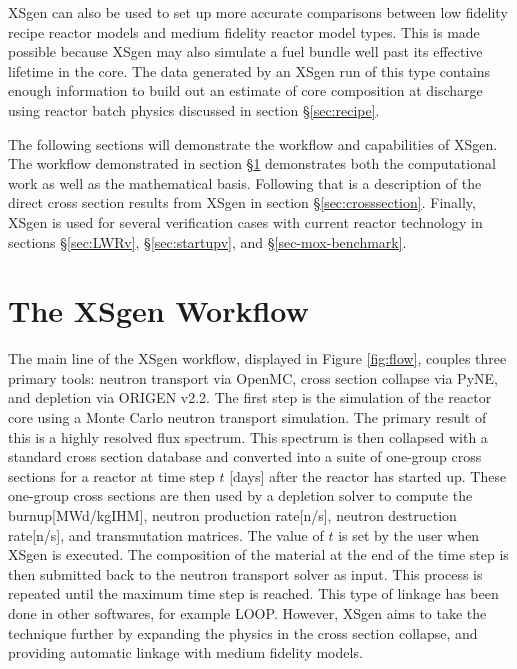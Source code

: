 \documentclass{article}
\begin{document}
XSgen can also be used to set up more accurate comparisons between low fidelity recipe reactor
models and medium fidelity reactor model types. This is made possible because XSgen may also
simulate a fuel bundle well past its effective lifetime in the core. The data generated by an
XSgen run of this type contains enough information to build out an estimate of core composition
at discharge using reactor batch physics discussed in section \S\ref{sec:recipe}.

The following sections will demonstrate the workflow and capabilities of XSgen. The workflow demonstrated in section 
\S\ref{sec-workflow} demonstrates 
both the computational work as well as the mathematical basis. Following that is a description of the direct cross 
section results from XSgen in section \S\ref{sec:crosssection}. Finally, XSgen is used for several verification cases with current reactor 
technology in sections \S\ref{sec:LWRv}, \S\ref{sec:startupv}, and \S\ref{sec-mox-benchmark}. 

\section{The XSgen Workflow}
\label{sec-workflow}

The main line of the XSgen workflow, displayed in Figure \ref{fig:flow}, couples three primary tools: neutron transport via OpenMC,
cross section collapse via PyNE, and depletion via ORIGEN v2.2. The first step is the simulation
of the reactor core using a Monte Carlo neutron transport simulation. The primary result of
this is a highly resolved flux spectrum. This spectrum is then collapsed with a standard
cross section database and converted into a suite of one-group cross sections for a reactor
at time step $t$ [days] after the reactor has started up. These one-group cross sections are
then used by a depletion solver to compute the burnup[MWd/kgIHM], neutron production rate[n/s], neutron
destruction rate[n/s], and transmutation matrices. The value of $t$ is set by the user when XSgen
is executed. The composition of the material at the end of the time step is then submitted
back to the neutron transport solver as input. This process is repeated until the maximum time
step is reached. This type of linkage has been done in other softwares, for example LOOP\cite{loop}. However, 
XSgen aims to take the technique further by expanding the physics in the cross section collapse, and providing 
automatic linkage with medium fidelity models.  
\end{document}

